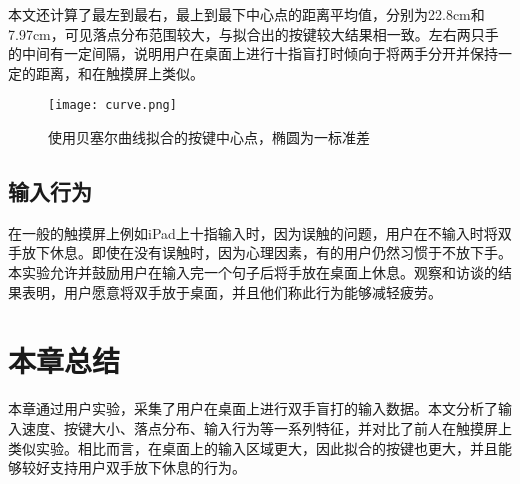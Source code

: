 本文还计算了最左到最右，最上到最下中心点的距离平均值，分别为22.8cm和7.97cm，可见落点分布范围较大，与拟合出的按键较大结果相一致。左右两只手的中间有一定间隔，说明用户在桌面上进行十指盲打时倾向于将两手分开并保持一定的距离，和在触摸屏上类似\cite{flatglass2011findlater}。
\begin{figure}[ht]
  \centering
  \texttt{[image: curve.png]}
  \caption{使用贝塞尔曲线拟合的按键中心点，椭圆为一标准差}
  \label{fig:keyboard-curve}
\end{figure}

\subsection{输入行为}
在一般的触摸屏上例如iPad上十指输入时，因为误触的问题，用户在不输入时将双手放下休息。即使在没有误触时，因为心理因素，有的用户仍然习惯于不放下手\cite{palmboard2020}。本实验允许并鼓励用户在输入完一个句子后将手放在桌面上休息。观察和访谈的结果表明，用户愿意将双手放于桌面，并且他们称此行为能够减轻疲劳。

\section{本章总结}
本章通过用户实验，采集了用户在桌面上进行双手盲打的输入数据。本文分析了输入速度、按键大小、落点分布、输入行为等一系列特征，并对比了前人在触摸屏上类似实验。相比而言，在桌面上的输入区域更大，因此拟合的按键也更大，并且能够较好支持用户双手放下休息的行为。